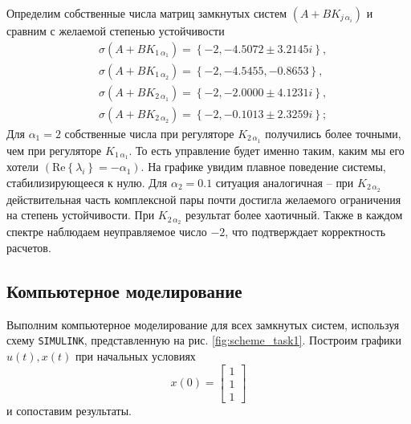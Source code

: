\documentclass[a4paper, 12pt]{article}
\begin{document}
    Определим собственные числа матриц замкнутых систем $\left( A+BK_{j\,\alpha_i} \right)$
    и сравним с желаемой степенью устойчивости
    \begin{align*}
    &\sigma\left( A+BK_{1\,\alpha_1} \right)=\left\{ -2, -4.5072\pm3.2145i \right\},\\
    &\sigma\left( A+BK_{1\,\alpha_2} \right)=\left\{ -2,-4.5455,-0.8653 \right\},\\
    &\sigma\left( A+BK_{2\,\alpha_1} \right)=\left\{ -2, -2.0000\pm4.1231i \right\},\\
    &\sigma\left( A+BK_{2\,\alpha_2} \right)=\left\{ -2,-0.1013\pm2.3259i \right\};
    \end{align*}
    Для $\alpha_1=2$ собственные числа при регуляторе $K_{2\,\alpha_1}$ получились более точными,
    чем при регуляторе $K_{1\,\alpha_1}$. То есть управление будет именно таким, каким мы его хотели $\left( \text{Re}\left\{ \lambda_i \right\}=-\alpha_1 \right)$.
    На графике увидим плавное поведение системы, стабилизирующееся к нулю. Для $\alpha_2=0.1$ ситуация аналогичная
    -- при $K_{2\,\alpha_2}$ действительная часть комплексной пары почти достигла желаемого ограничения на степень устойчивости.
    При $K_{2\,\alpha_2}$ результат более хаотичный. Также в каждом спектре наблюдаем неуправляемое число $-2$, что подтверждает
    корректность расчетов.


    \subsection{Компьютерное моделирование}
    Выполним компьютерное моделирование для всех замкнутых систем, используя схему \texttt{SIMULINK},
    представленную на рис. \ref{fig:scheme_task1}. Построим графики $u(t),x(t)$ при начальных условиях
    $$x(0)=\begin{bmatrix}
        1 \\1 \\1
    \end{bmatrix}$$ и сопоставим результаты.
\end{document}
